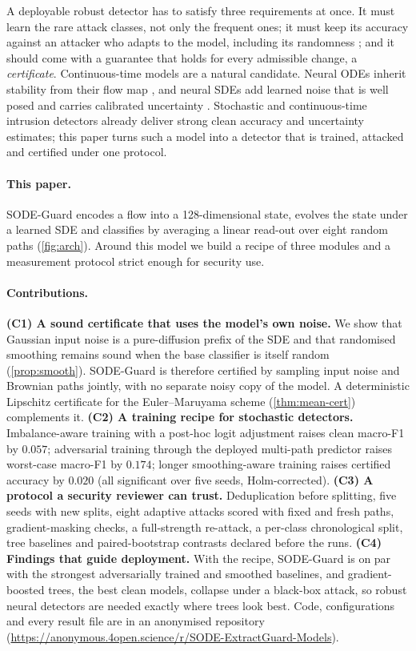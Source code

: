 \documentclass{article}
\newcommand{\anonrepo}{\url{https://anonymous.4open.science/r/SODE-ExtractGuard-Models}}
\theoremstyle{definition}
\begin{document}
A deployable robust detector has to satisfy three requirements at once. It must
learn the rare attack classes, not only the frequent ones; it must keep its
accuracy against an attacker who adapts to the model, including its
randomness \citep{athalye2018obfuscated,carlini2019evaluating}; and it should
come with a guarantee that holds for every admissible change, a
\emph{certificate}. Continuous-time models are a natural candidate. Neural ODEs
inherit stability from their flow map \citep{kang2021sodef}, and neural SDEs
\citep{tzen2019nsde,li2020scalable} add learned noise that is well posed and
carries calibrated uncertainty \citep{oh2024stablesde,liu2020sdenoise}.
Stochastic and continuous-time intrusion detectors
\citep{anaedevha2026ode,anaedevha2026mstgnn} already deliver
strong clean accuracy and uncertainty estimates; this paper turns such a model
into a detector that is trained, attacked and certified under one protocol.

\paragraph{This paper.} SODE-Guard encodes a flow into a 128-dimensional state,
evolves the state under a learned SDE and classifies by averaging a linear
read-out over eight random paths (\cref{fig:arch}). Around this model we build
a recipe of three modules and a measurement protocol strict enough for
security use.

\paragraph{Contributions.}
\textbf{(C1) A sound certificate that uses the model's own noise.} We show that
Gaussian input noise is a pure-diffusion prefix of the SDE and that randomised
smoothing remains sound when the base classifier is itself random
(\cref{prop:smooth}). SODE-Guard is therefore certified by sampling input noise
and Brownian paths jointly, with no separate noisy copy of the model. A
deterministic Lipschitz certificate for the Euler--Maruyama scheme
(\cref{thm:mean-cert}) complements it.
\textbf{(C2) A training recipe for stochastic detectors.} Imbalance-aware
training with a post-hoc logit adjustment raises clean macro-F1 by $0.057$;
adversarial training through the deployed multi-path predictor raises
worst-case macro-F1 by $0.174$; longer smoothing-aware training raises
certified accuracy by $0.020$ (all significant over five seeds, Holm-corrected).
\textbf{(C3) A protocol a security reviewer can trust.} Deduplication before
splitting, five seeds with new splits, eight adaptive attacks scored with
fixed and fresh paths, gradient-masking checks, a full-strength re-attack, a
per-class chronological split, tree baselines and paired-bootstrap contrasts
declared before the runs.
\textbf{(C4) Findings that guide deployment.} With the recipe, SODE-Guard is on
par with the strongest adversarially trained and smoothed baselines, and
gradient-boosted trees, the best clean models, collapse under a black-box
attack, so robust neural detectors are needed exactly where trees look best.
Code, configurations and every result file are in an anonymised repository
(\anonrepo).
\end{document}
